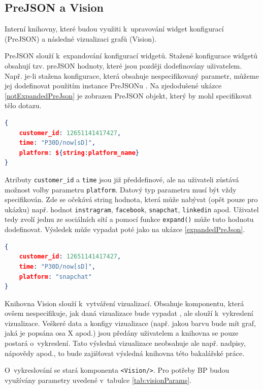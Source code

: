 \documentclass[czech, bc, kiv, he, iso690numb]{fasthesis}
\begin{document}
\subsection{PreJSON a Vision}

Interní knihovny, které budou využiti k~upravování widget konfigurací (PreJSON) a následné vizualizaci grafů (Vision).

PreJSON slouží k~expandování konfigurací widgetů. Stažené konfigurace widgetů obsahují tzv. preJSON hodnoty, které jsou později dodefinovány uživatelem. Např. je-li stažena konfigurace, která obsahuje
nespecifikovaný parametr, můžeme jej dodefinovat použitím instance PreJSONu \cite{preJSONDocs}. Na zjedodušené ukázce \ref{notExpandedPreJson} je zobrazen PreJSON objekt, který by mohl specifikovat tělo dotazu. 

\begin{lstlisting}[language=json, caption={Neexpandovaný PreJSON objekt}, label=notExpandedPreJson]
{
	customer_id: 12651141417427,
	time: "P30D/now[sD]",
	platform: ${string:platform_name}
}
\end{lstlisting}
		
Atributy \texttt{customer\_id} a \texttt{time} jsou již předdefinové, ale na uživateli zůstává možnost volby parametru \texttt{platform}. Datový typ parametru musí být vždy specifikován.
Zde se očekává string hodnota, která může nabývat (opět pouze pro ukázku) např. hodnot \texttt{instragram}, \texttt{facebook}, \texttt{snapchat}, \texttt{linkedin} apod. Uživatel tedy zvolí jednu ze sociálních sítí
a pomocí funkce \texttt{expand()} může tuto hodnotu dodefinovat. Výsledek může vypadat poté jako na ukázce \ref{expandedPreJson}.

\begin{lstlisting}[language=json, caption={Expandovaný PreJSON objekt}, label=expandedPreJson]
{
	customer_id: 12651141417427,
	time: "P30D/now[sD]",
	platform: "snapchat"
}
\end{lstlisting}

Knihovna Vision slouží k~vytváření vizualizací. Obsahuje komponentu, která ovšem nespecifikuje, jak daná vizualizace bude vypadat \cite{visionDocs}, ale slouží k~vykreslení vizualizace. 
Veškeré data a konfigy vizualizace (např. jakou barvu bude mít graf, jaká je popsána osa X apod.) jsou předány uživatelem a knihovna se pouze postará o~vykreslení. Tato výsledná vizualizace 
neobsahuje ale např. nadpisy, nápovědy apod., to bude zajišťovat výsledná knihovna této bakalářské práce.

O~vykreslování se stará komponenta \texttt{<Vision/>}. Pro potřeby BP budou využívány parametry uvedené v~tabulce \ref{tab:visionParams}.
\end{document}
